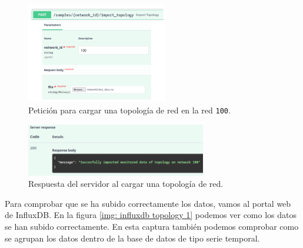 \documentclass[a4paper, oneside, 12pt]{book}
\begin{document}
 	\begin{figure}[h!]
 		\begin{center}
 			\includegraphics[width=0.55\textwidth]{diag/request_topology_1.png}
 			\caption{Petición para cargar una topología de red en la red \texttt{100}.}
 			\label{img: request topology 1}
 		\end{center}
 	\end{figure}
 
 	\begin{figure}[h!]
 		\begin{center}
 			\includegraphics[width=0.7\textwidth]{img/response_topology_1.png}
 			\caption{Respuesta del servidor al cargar una topología de red.}
 			\label{img: response topology 1}
 		\end{center}
 	\end{figure}
	
	\pagebreak
	
	\noindent Para comprobar que se ha subido correctamente los datos, vamos al portal web de InfluxDB. En la figura \ref{img: influxdb topology 1} podemos ver como los datos se han subido correctamente. En esta captura también podemos comprobar como se agrupan los datos dentro de la base de datos de tipo serie temporal. 
	
\end{document}
